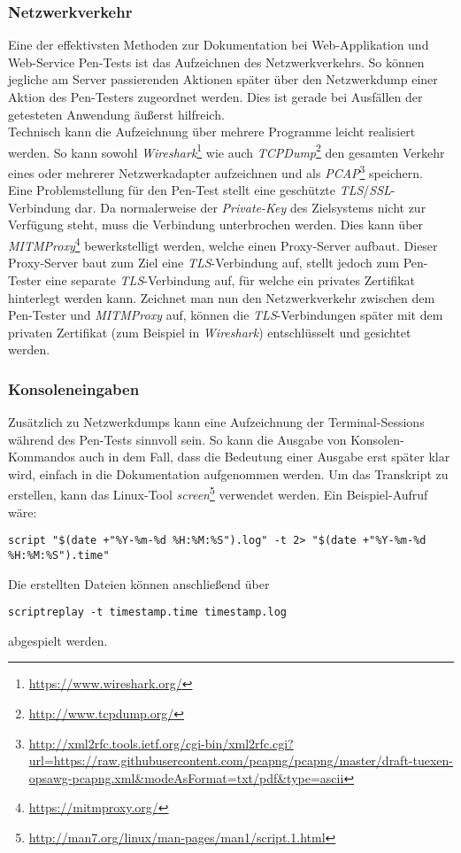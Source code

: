 		\subsubsection{Netzwerkverkehr}
		Eine der effektivsten Methoden zur Dokumentation bei Web-Applikation und Web-Service Pen-Tests ist das Aufzeichnen des Netzwerkverkehrs. So können jegliche am Server passierenden Aktionen später über den Netzwerkdump einer Aktion des Pen-Testers zugeordnet werden. Dies ist gerade bei Ausfällen der getesteten Anwendung äußerst hilfreich.\\
		
		Technisch kann die Aufzeichnung über mehrere Programme leicht realisiert werden. So kann sowohl \textit{Wireshark}\footnote{\url{https://www.wireshark.org/}} wie auch \textit{TCPDump}\footnote{\url{http://www.tcpdump.org/}} den gesamten Verkehr eines oder mehrerer Netzwerkadapter aufzeichnen und als \textit{PCAP}\footnote{\url{http://xml2rfc.tools.ietf.org/cgi-bin/xml2rfc.cgi?url=https://raw.githubusercontent.com/pcapng/pcapng/master/draft-tuexen-opsawg-pcapng.xml&modeAsFormat=txt/pdf&type=ascii}} speichern.\\
		
		Eine Problemstellung für den Pen-Test stellt eine geschützte \textit{TLS}/\textit{SSL}-Verbindung dar. Da normalerweise der \textit{Private-Key} des Zielsystems nicht zur Verfügung steht, muss die Verbindung unterbrochen werden. Dies kann über \textit{MITMProxy}\footnote{\url{https://mitmproxy.org/}} bewerkstelligt werden, welche einen Proxy-Server aufbaut. Dieser Proxy-Server baut zum Ziel eine \textit{TLS}-Verbindung auf, stellt jedoch zum Pen-Tester eine separate \textit{TLS}-Verbindung auf, für welche ein privates Zertifikat hinterlegt werden kann. Zeichnet man nun den Netzwerkverkehr zwischen dem Pen-Tester und \textit{MITMProxy} auf, können die \textit{TLS}-Verbindungen später mit dem privaten Zertifikat (zum Beispiel in \textit{Wireshark}) entschlüsselt und gesichtet werden.
		
		\newpage
		\subsubsection{Konsoleneingaben}
		Zusätzlich zu Netzwerkdumps kann eine Aufzeichnung der Terminal-Sessions während des Pen-Tests sinnvoll sein. So kann die Ausgabe von Konsolen-Kommandos auch in dem Fall, dass die Bedeutung einer Ausgabe erst später klar wird, einfach in die Dokumentation aufgenommen werden. Um das Transkript zu erstellen, kann das Linux-Tool \textit{screen}\footnote{\url{http://man7.org/linux/man-pages/man1/script.1.html}} verwendet werden. Ein Beispiel-Aufruf wäre:
\lstset{language=bash}
\begin{lstlisting}
script "$(date +"%Y-%m-%d %H:%M:%S").log" -t 2> "$(date +"%Y-%m-%d %H:%M:%S").time"
\end{lstlisting}
Die erstellten Dateien können anschließend über 
\begin{lstlisting}
scriptreplay -t timestamp.time timestamp.log
\end{lstlisting}
abgespielt werden.
		
